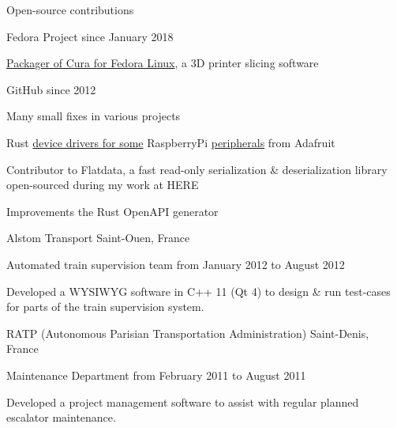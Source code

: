 \documentclass[10pt, a4paper]{awesome-cv}
\begin{document}
\begin{cventries}
	\cventrytitle
	{Open-source contributions}
	{}

	\cventry
	{Fedora Project}
	{since January 2018}
	{
		\begin{cvitems}
			\item{\href{https://src.fedoraproject.org/rpms/cura}{Packager of Cura for Fedora Linux}, a 3D printer slicing software}
		\end{cvitems}
	}

	\cventry
	{GitHub}
	{since 2012}
	{
		\begin{cvitems}
			\item {Many small fixes in various projects}
			\item {Rust \href{https://github.com/gferon/rustberrypi-playground}{device drivers for some} RaspberryPi \href{https://github.com/gferon/am2320.rs}{peripherals} from Adafruit}
			\item {Contributor to Flatdata, a fast read-only serialization \& deserialization library open-sourced during my work at HERE}
			\item {Improvements the Rust OpenAPI generator}
		\end{cvitems}
	}
\end{cventries}



\begin{cventries}

	\cventrytitle
	{Alstom Transport}
	{Saint-Ouen, France}

	\cventry
	{Automated train supervision team}
	{from January 2012 to August 2012}
	{
		\begin{cvparagraph}
			Developed a WYSIWYG software in C++ 11 (Qt 4) to design \& run test-cases for parts of the train supervision system.
		\end{cvparagraph}
		\vspace{4pt}
	}

	\cventrytitle
	{RATP (Autonomous Parisian Transportation Administration)}
	{Saint-Denis, France}

	\cventry
	{Maintenance Department}
	{from February 2011 to August 2011}
	{
		\begin{cvparagraph}
			Developed a project management software to assist with regular planned escalator maintenance.
		\end{cvparagraph}
	}

\end{cventries}
\end{document}
